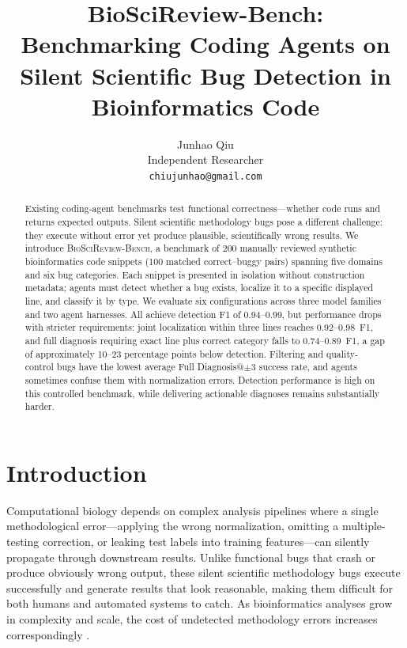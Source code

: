 \documentclass[11pt]{article}
\title{BioSciReview-Bench: Benchmarking Coding Agents on\\Silent Scientific Bug Detection in Bioinformatics Code}
\author{Junhao Qiu \\
  Independent Researcher \\
  \texttt{chiujunhao@gmail.com}}
\newcommand{\bench}{\textsc{BioSciReview-Bench}}
\begin{document}
\maketitle

\begin{abstract}
Existing coding-agent benchmarks test functional correctness---whether code runs and returns expected outputs. Silent scientific methodology bugs pose a different challenge: they execute without error yet produce plausible, scientifically wrong results. We introduce \bench, a benchmark of 200 manually reviewed synthetic bioinformatics code snippets (100 matched correct--buggy pairs) spanning five domains and six bug categories. Each snippet is presented in isolation without construction metadata; agents must detect whether a bug exists, localize it to a specific displayed line, and classify it by type. We evaluate six configurations across three model families and two agent harnesses. All achieve detection F1 of 0.94--0.99, but performance drops with stricter requirements: joint localization within three lines reaches 0.92--0.98~F1, and full diagnosis requiring exact line plus correct category falls to 0.74--0.89~F1, a gap of approximately 10--23 percentage points below detection. Filtering and quality-control bugs have the lowest average Full Diagnosis@$\pm$3 success rate, and agents sometimes confuse them with normalization errors. Detection performance is high on this controlled benchmark, while delivering actionable diagnoses remains substantially harder.
\end{abstract}

\section{Introduction}

Computational biology depends on complex analysis pipelines where a single methodological error---applying the wrong normalization, omitting a multiple-testing correction, or leaking test labels into training features---can silently propagate through downstream results. Unlike functional bugs that crash or produce obviously wrong output, these silent scientific methodology bugs execute successfully and generate results that look reasonable, making them difficult for both humans and automated systems to catch. As bioinformatics analyses grow in complexity and scale, the cost of undetected methodology errors increases correspondingly \citep{baker2016reproducibility}.
\end{document}
